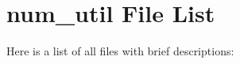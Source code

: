 \section{num\_\-util File List}
Here is a list of all files with brief descriptions:\begin{CompactList}
\item{}
\item{}
\end{CompactList}
